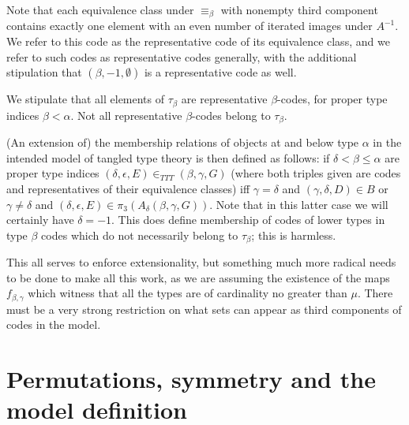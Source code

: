 \begin{definition}
\label {def:representative-code}  

Note that each equivalence class under $\equiv_\beta$ with nonempty third component contains exactly one
element with an even number of iterated images under $A^{-1}$.  We refer to this code as the representative code of its equivalence class, and we refer to such codes as representative codes generally, with the additional stipulation
that $(\beta,-1,\emptyset)$ is a representative code as well.
\end{definition}

\begin{lemma}
\label {objects-are-representative}  
We stipulate that all elements of $\tau_\beta$ are representative $\beta$-codes, for proper type indices $\beta<\alpha$.
Not all representative $\beta$-codes belong to $\tau_\beta$.
\end{lemma}

\begin{definition}
\label {ttt-membership}      
(An extension of) the membership relations of objects at and below type $\alpha$ in the intended model of tangled type theory is then defined as follows: if $\delta < \beta \leq \alpha$ are proper type indices  $(\delta,\epsilon,E) \in_{TTT} (\beta,\gamma,G)$ (where both triples given are codes and representatives of their equivalence classes) iff $\gamma=\delta$ and
$(\gamma,\delta,D)  \in B$ or $\gamma\neq \delta$ and $(\delta,\epsilon,E) \in \pi_3(A_{\delta}(\beta,\gamma,G))$.  Note that in this latter case we will certainly have $\delta=-1$.  This does define membership of codes of lower types in
type $\beta$ codes which do not necessarily belong to $\tau_\beta$;  this is harmless.
\end{definition}

This all serves to enforce extensionality, but something much more radical needs to be done to make all this work, as we are assuming the existence of the maps $f_{\beta,\gamma}$ which witness that all the types are of cardinality no greater than $\mu$.  There must be a very strong restriction on what sets can appear as third components of codes in the model.

\section{Permutations, symmetry and the model definition}

